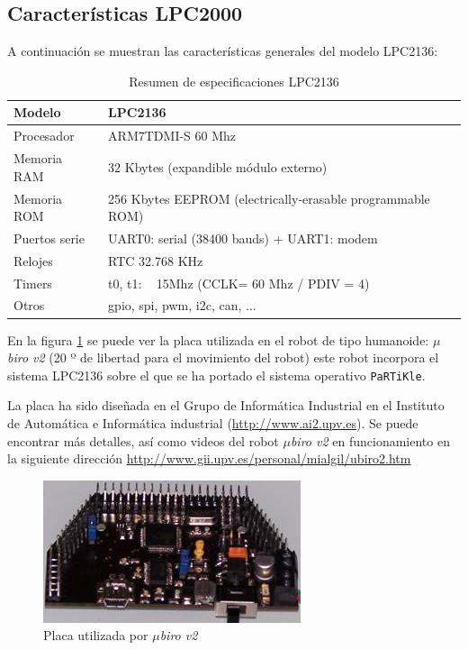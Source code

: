 \documentclass[10pt,a4paper]{article}
\newcommand{\partikle}[0]{\texttt{PaRTiKle}}
\newcommand{\hrefx}[1]{\href{#1}{#1}} %
\begin{document}
	\subsection{Características LPC2000}
	
	A continuación se muestran las características generales del modelo LPC2136:
		
	\begin{table}[ht]
	\centering
	\begin{tabular}{|l|l|} \hline
	Modelo		&	LPC2136  \\ \hline
	Procesador	&	ARM7TDMI-S 60 Mhz \\ \hline
	Memoria  RAM	&	32 Kbytes (expandible módulo externo)\\ \hline
	Memoria  ROM	&	256 Kbytes EEPROM (electrically-erasable programmable ROM)\\ \hline
	Puertos serie	&	UART0: serial (38400 bauds) + UART1: modem \\ \hline
	Relojes		&	RTC 32.768 KHz \\ \hline
	Timers		&	t0, t1:  ~ 15Mhz (CCLK= 60 Mhz / PDIV = 4) \\ \hline
	Otros		&	gpio, spi, pwm, i2c, can, ... \\ \hline
	\end{tabular}
	
	\caption{Resumen de especificaciones LPC2136}
	\label{fig:resumen}
	\end{table}
	
	En la figura \ref{fig:lpc-ubirov2} se puede ver la placa utilizada en el robot
	de tipo humanoide: \emph{$\mu$biro v2} (20 º de libertad para el movimiento del robot)
	este robot incorpora el sistema LPC2136 sobre el que se ha portado el sistema operativo \partikle{}.
	
	La placa ha sido diseñada en el Grupo de Informática Industrial en el Instituto de Automática e Informática industrial (\hrefx{http://www.ai2.upv.es}).
	Se puede encontrar más detalles, así como videos del robot  \emph{$\mu$biro v2} en funcionamiento
	en la siguiente dirección \hrefx{http://www.gii.upv.es/personal/mialgil/ubiro2.htm}
	
	\begin{figure}[htbp]
	\begin{center}
	\includegraphics[width = 0.8\columnwidth]{img/lpc-ubirov2}
	\end{center}
	
	\caption{Placa utilizada por \emph{$\mu$biro v2}}
	\label{fig:lpc-ubirov2}
	\end{figure}
	
\end{document}
